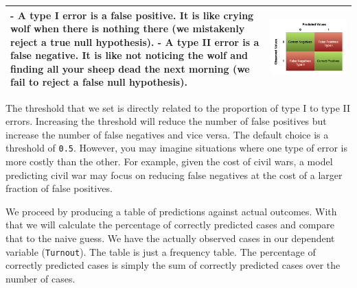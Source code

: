 \documentclass[]{article}
\theoremstyle{definition}
\theoremstyle{definition}
\theoremstyle{remark}
\begin{document}
\begin{longtable}[c]{@{}ll@{}}
\toprule
\begin{minipage}[t]{0.50\columnwidth}\raggedright\strut
- A type I error is a false positive. It is like crying wolf when there
is nothing there (we mistakenly reject a true null hypothesis). - A type
II error is a false negative. It is like not noticing the wolf and
finding all your sheep dead the next morning (we fail to reject a false
null hypothesis).
\strut\end{minipage} &
\begin{minipage}[t]{0.43\columnwidth}\raggedright\strut
\includegraphics{./img/confusion_matrix.png}
\strut\end{minipage}\tabularnewline
\bottomrule
\end{longtable}

The threshold that we set is directly related to the proportion of type
I to type II errors. Increasing the threshold will reduce the number of
false positives but increase the number of false negatives and vice
versa. The default choice is a threshold of \texttt{0.5}. However, you
may imagine situations where one type of error is more costly than the
other. For example, given the cost of civil wars, a model predicting
civil war may focus on reducing false negatives at the cost of a larger
fraction of false positives.

We proceed by producing a table of predictions against actual outcomes.
With that we will calculate the percentage of correctly predicted cases
and compare that to the naive guess. We have the actually observed cases
in our dependent variable (\texttt{Turnout}). The table is just a
frequency table. The percentage of correctly predicted cases is simply
the sum of correctly predicted cases over the number of cases.
\end{document}
